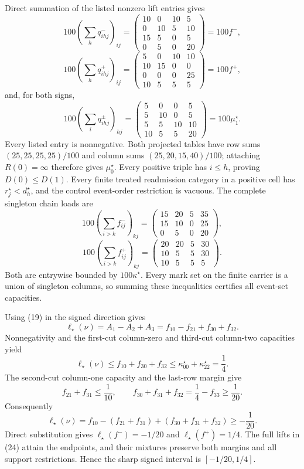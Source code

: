 Direct summation of the listed nonzero lift entries gives
\[
100\left(\sum_hq^-_{ihj}\right)_{ij}
=\begin{pmatrix}10&0&10&5\\0&10&5&10\\15&5&0&5\\0&5&0&20\end{pmatrix}
=100f^-,
\]
\[
100\left(\sum_hq^+_{ihj}\right)_{ij}
=\begin{pmatrix}5&0&10&10\\10&15&0&0\\0&0&0&25\\10&5&5&5\end{pmatrix}
=100f^+,
\]
and, for both signs,
\[
100\left(\sum_iq^\pm_{ihj}\right)_{hj}
=\begin{pmatrix}5&0&0&5\\5&10&0&5\\5&5&10&10\\10&5&5&20\end{pmatrix}
=100\mu_1^\star.                                                     \tag{24}
\]
Every listed entry is nonnegative.  Both projected tables have row sums \((25,25,25,25)/100\) and column sums \((25,20,15,40)/100\); attaching \(R(0)=\infty\) therefore gives \(\mu_0^\star\).  Every positive triple has \(i\leq h\), proving \(D(0)\leq D(1)\).  Every finite treated readmission category in a positive cell has \(r_j^\star<d_h^\star\), and the control event-order restriction is vacuous.  The complete singleton chain loads are
\[
100\left(\sum_{i>k}f^-_{ij}\right)_{kj}
=\begin{pmatrix}15&20&5&35\\15&10&0&25\\0&5&0&20\end{pmatrix},
\]
\[
100\left(\sum_{i>k}f^+_{ij}\right)_{kj}
=\begin{pmatrix}20&20&5&30\\10&5&5&30\\10&5&5&5\end{pmatrix}.
\]
Both are entrywise bounded by \(100\kappa^\star\).  Every mark set on the finite carrier is a union of singleton columns, so summing these inequalities certifies all event-set capacities.

Using (19) in the signed direction gives
\[
\ell_\star(\nu)=A_1-A_2+A_3=f_{10}-f_{21}+f_{30}+f_{32}.             \tag{25}
\]
Nonnegativity and the first-cut column-zero and third-cut column-two capacities yield
\[
\ell_\star(\nu)
\leq f_{10}+f_{30}+f_{32}
\leq\kappa^\star_{00}+\kappa^\star_{22}=\frac14.                    \tag{26}
\]
The second-cut column-one capacity and the last-row margin give
\[
f_{21}+f_{31}\leq\frac1{10},
\qquad
f_{30}+f_{31}+f_{32}=\frac14-f_{33}\geq\frac1{20}.
\]
Consequently
\[
\ell_\star(\nu)
=f_{10}-(f_{21}+f_{31})+(f_{30}+f_{31}+f_{32})
\geq-\frac1{20}.                                                      \tag{27}
\]
Direct substitution gives \(\ell_\star(f^-)=-1/20\) and \(\ell_\star(f^+)=1/4\).  The full lifts in (24) attain the endpoints, and their mixtures preserve both margins and all support restrictions.  Hence the sharp signed interval is \([-1/20,1/4]\).

